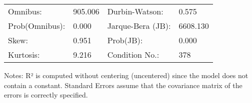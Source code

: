 \begin{table}
\begin{center}
\begin{tabular}{llll}
\hline
Omnibus:       & 905.006 & Durbin-Watson:    & 0.575     \\
Prob(Omnibus): & 0.000   & Jarque-Bera (JB): & 6608.130  \\
Skew:          & 0.951   & Prob(JB):         & 0.000     \\
Kurtosis:      & 9.216   & Condition No.:    & 378       \\
\hline
\end{tabular}
\end{center}
\end{table}
\bigskip
Notes: \newline 
[1] R² is computed without centering (uncentered) since the                 model does not contain a constant. \newline 
[2] Standard Errors assume that the covariance matrix of the errors is correctly specified.